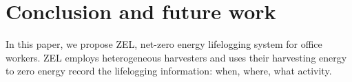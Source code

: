 \documentclass[conference]{IEEEtran}
\begin{document}
\section{Conclusion and future work} \label{sec:conclusion}
\begin{comment}
本論文ではオフィスワーカのためのネットゼロエナジーライフロギングシステムであるZELを提案した
ZELはヘテロジニアスなハーベスタを採用し、それらの収穫エネルギーを使いライフログに必要ないつ、どこで、何の行動をしていたかの情報をゼロエナジーで記録する
さらにデュアルパワースイッチング回路とボルテージディタクターによるシステム状態スケジューリングによって電池使用を最小化する
ライフログ構成ブロックでは記録された時系列データから機械学習を用いて場所認識及び行動認識を行いユーザのライフログを構成する
我々はZELを名札型のウェアラブルデバイスに実装し大規模なデータ収集実験を11人の被験者を対象に行った
評価の結果Person-Dependentモデルで87.2\%の場所認識精度を93.1\%の行動認識精度を達成した
また電池使用最少化機構によって実環境で約99\%のゼロエナジーを達成し、ZELがネットゼロエナジーシステムであることを示した。


ZELはユーザフレンドリーなデバイスのためにいくつかの課題がある
まずデバイスの大きさと重さに関する問題である
本研究で実装した名札型のデバイスは123mmの正方形とウェアラブルにしては大きすぎる
また首かけ式のため192グラムという重さはネックペインの原因となる
しかし、回路は図2に示すように十分小型であるため小型で軽量なハーベスタ例えばリコーのOPVを使うことでサイズと重さは抑えることができる
次に汎用性に関する問題である
3章で示したようにPerson-Independentモデルでは認識精度が著しく低下する
これはユーザの姿勢によってできる影や光源に対する方向などが原因と考えられるためシステムの実装場所を変えることで克服することができると考える
例えばシステムを帽子型のデバイスに実装すればユーザの姿勢などに影響されないため認識精度の向上が見込める
最後にデータの取得に関する問題がある
ユーザがライフログを確認したいと思った時デバイスにケーブルを接続しデータを抽出する必要がある
データ量が多い場合吸出しに時間がかかるため非常に煩わしい
しかしSolARで示されているend-to-endなコンテキスト認識に必要な電力である33mW以上を現在LEDで消費しているためZELもライフログ情報送信までを含めたend-to-endなコンテキスト認識を実装できる能力を秘めてい
今後の展望としてこれら課題を解決しユーザフレンドリーなデバイスを目指す
\end{comment}
In this paper, we propose ZEL, net-zero energy lifelogging system for office workers.
ZEL employs heterogeneous harvesters and uses their harvesting energy to zero energy record the lifelogging information: when, where, what activity.
\end{document}

